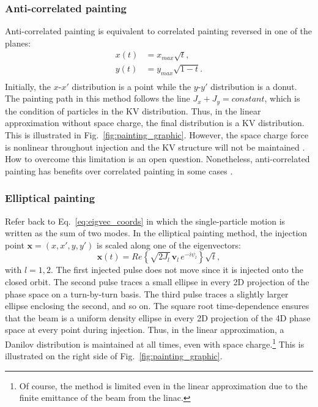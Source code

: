 \subsubsection{Anti-correlated painting}

Anti-correlated painting is equivalent to correlated painting reversed in one of the planes:
%
\begin{equation}
\begin{aligned}
    {x}(t) &= x_{max}\sqrt{t}, \\
    {y}(t) &= y_{max}\sqrt{1 - t}. \\
\end{aligned}
\end{equation}
%
Initially, the $x$-$x'$ distribution is a point while the $y$-$y'$ distribution is a donut. The painting path in this method follows the line $J_x + J_y = constant$, which is the condition of particles in the KV distribution. Thus, in the linear approximation without space charge, the final distribution is a KV distribution. This is illustrated in Fig.~\ref{fig:painting_graphic}. However, the space charge force is nonlinear throughout injection and the KV structure will not be maintained \cite{Crosbie1996}. How to overcome this limitation is an open question. Nonetheless, anti-correlated painting has benefits over correlated painting in some cases \cite{Hotchi2020}.


\subsubsection{Elliptical painting}

Refer back to Eq.~\eqref{eq:eigvec_coords} in which the single-particle motion is written as the sum of two modes. In the elliptical painting method, the injection point $\mathbf{x} = (x, x', y, y')$ is scaled along one of the eigenvectors:
%
\begin{equation}\label{eq:elliptical_painting}
    \mathbf{x}(t) =  
    Re \left\{ \sqrt{2 J_l} \, \mathbf{v}_l \, e^{-i\psi_l} \right\} \sqrt{t},
\end{equation}
%
with $l = 1,2$. The first injected pulse does not move since it is injected onto the closed orbit. The second pulse traces a small ellipse in every 2D projection of the phase space on a turn-by-turn basis. The third pulse traces a slightly larger ellipse enclosing the second, and so on. The square root time-dependence ensures that the beam is a uniform density ellipse in every 2D projection of the 4D phase space at every point during injection. Thus, in the linear approximation, a Danilov distribution is maintained at all times, even with space charge.\footnote{Of course, the method is limited even in the linear approximation due to the finite emittance of the beam from the linac.} This is illustrated on the right side of Fig.~\ref{fig:painting_graphic}.

